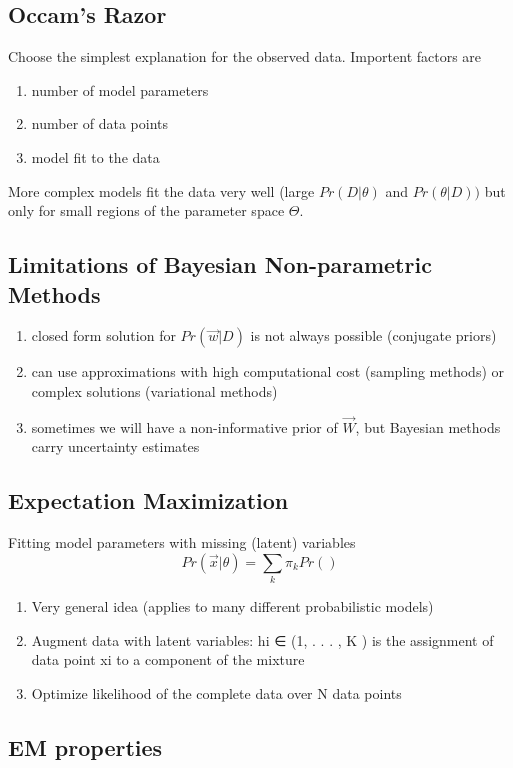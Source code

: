 \documentclass[12pt]{article}
\numberwithin{equation}{section}
\begin{document}
\subsection{Occam's Razor}
Choose the simplest explanation for the observed data. Importent factors are
\begin{enumerate}
\item number of model parameters
\item number of data points 
\item model fit to the data
\end{enumerate}

More complex models fit the data very well (large $Pr(D|\theta)$ and $Pr(\theta|D))$ but only for small regions of the parameter space $\Theta$.

\subsection{Limitations of Bayesian Non-parametric Methods}
\begin{enumerate}
\item closed form solution for $Pr(\vec{w}|D)$ is not always possible (conjugate priors)
\item can use approximations with high computational cost (sampling methods) or complex solutions (variational methods)
\item sometimes we will have a non-informative prior of $\vec{W}$, but Bayesian methods carry uncertainty estimates
\end{enumerate}

\subsection{Expectation Maximization}
Fitting model parameters with missing (latent) variables
\begin{equation}
Pr(\vec{x} | \theta )  = \sum_k \pi_k Pr()
\end{equation}
\begin{enumerate}
\item Very general idea (applies to many different probabilistic
models)
\item Augment data with latent variables: hi ∈ (1, . . . , K ) is the
assignment of data point xi to a component of the mixture
\item Optimize likelihood of the complete data over N data points
\end{enumerate}
\subsection{EM properties}
\end{document}
